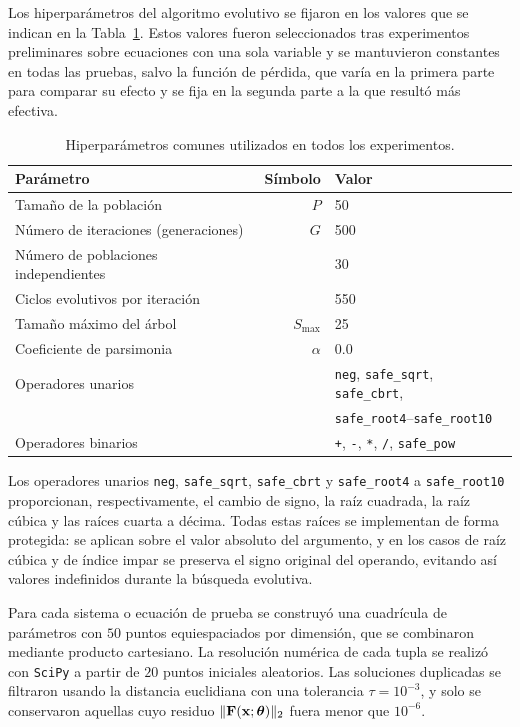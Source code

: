 Los hiperparámetros del algoritmo evolutivo se fijaron en los valores que se indican en la Tabla~\ref{tab:hiperparams}. Estos valores fueron seleccionados tras experimentos preliminares sobre ecuaciones con una sola variable y se mantuvieron constantes en todas las pruebas, salvo la función de pérdida, que varía en la primera parte para comparar su efecto y se fija en la segunda parte a la que resultó más efectiva.

\begin{table}[H] \centering \caption{Hiperparámetros comunes utilizados en todos los experimentos.} \label{tab:hiperparams} \begin{tabular}{lrl} \hline
Parámetro & Símbolo & Valor \\
\hline
Tamaño de la población & $P$ & 50 \\
Número de iteraciones (generaciones) & $G$ & 500 \\
Número de poblaciones independientes & & 30 \\
Ciclos evolutivos por iteración & & 550 \\
Tamaño máximo del árbol & $S_{\max}$ & 25 \\
Coeficiente de parsimonia & $\alpha$ & 0.0 \\
Operadores unarios & & \texttt{neg}, \texttt{safe\_sqrt}, \texttt{safe\_cbrt}, \\
 & & \texttt{safe\_root4}--\texttt{safe\_root10} \\
Operadores binarios & & \texttt{+}, \texttt{-}, \texttt{*}, \texttt{/}, \texttt{safe\_pow} \\
\hline \end{tabular} \end{table}

Los operadores unarios \texttt{neg}, \texttt{safe\_sqrt}, \texttt{safe\_cbrt} y \texttt{safe\_root4} a \texttt{safe\_root10} proporcionan, respectivamente, el cambio de signo, la raíz cuadrada, la raíz cúbica y las raíces cuarta a décima. Todas estas raíces se implementan de forma protegida: se aplican sobre el valor absoluto del argumento, y en los casos de raíz cúbica y de índice impar se preserva el signo original del operando, evitando así valores indefinidos durante la búsqueda evolutiva.

Para cada sistema o ecuación de prueba se construyó una cuadrícula de parámetros con $50$ puntos equiespaciados por dimensión, que se combinaron mediante producto cartesiano. La resolución numérica de cada tupla se realizó con \texttt{SciPy} \cite{virtanen2020scipy} a partir de $20$ puntos iniciales aleatorios. Las soluciones duplicadas se filtraron usando la distancia euclidiana con una tolerancia $\tau = 10^{-3}$, y solo se conservaron aquellas cuyo residuo $\|\mathbf{F}(\mathbf{x}; \boldsymbol{\theta})\|_2$ fuera menor que $10^{-6}$.

